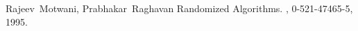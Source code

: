 \documentclass[11pt]{article}
\begin{document}
\begin{thebibliography}{42}


 Rajeev~Motwani, Prabhakar~Raghavan
 \newblock Randomized Algorithms.
 , 0-521-47465-5, 1995. %


\end{thebibliography}
\end{document}
